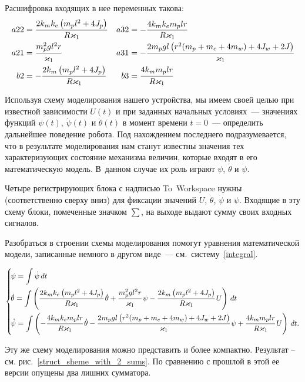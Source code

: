 \documentclass[12pt,a4paper,openany]{extarticle}
\begin{document}
Расшифровка входящих в нее переменных такова:
\begin{align}
	a22 &= \frac{2k_mk_e\left(m_pl^2 + 4J_p\right)}{R\varkappa_1} & 
	a32 &= -\frac{4k_mk_em_plr}{R\varkappa_1}\notag \\
	a21 &= \frac{m_p^2gl^2r}{\varkappa_1} & 
	a31 &= -\cfrac{2m_pgl\left(r^2(m_p + m_c + 4m_w) + 4J_w + 2J\right)}{\varkappa_1} \\
	b2 &= -\frac{2k_m\left(m_pl^2 + 4J_p\right)}{R\varkappa_1} & 
	b3 &= \cfrac{4k_mm_plr}{R\varkappa_1} \notag
\end{align}

Используя схему моделирования нашего устройства, мы имеем своей целью при известной зависимости $U(t)$ и при заданных начальных условиях~--- значениях функций $\psi(t)$, $\dot{\psi}(t)$ и $\dot{\theta}(t)$ в момент времени $t=0$~--- определить дальнейшее поведение робота.
Под нахождением последнего подразумевается, что в результате моделирования нам станут известны значения тех характеризующих состояние механизма величин, которые входят в его математическую модель.
В~данном случае их роль играют $\psi$, $\dot{\theta}$ и $\dot{\psi}$.

Четыре регистрирующих блока с надписью To~Workspace нужны (соответственно сверху вниз) для фиксации значений $U$, $\dot{\theta}$, $\dot{\psi}$ и $\psi$.
Входящие в эту схему блоки, помеченные значком $\sum$, на выходе выдают сумму своих входных сигналов.

Разобраться в строении схемы моделирования помогут уравнения математической модели, записанные немного в другом виде~--- см.~систему~\eqref{integral}.
 
\begin{equation}\label{integral}
	\left\{  
	\begin{aligned}
		\!&\psi = \int\dot{\psi}\,dt\\
		\!&\dot\theta = \int\left(\cfrac{2k_mk_e\left(m_pl^2 + 4J_p\right)}{R\varkappa_1}\,\dot\theta +
		\cfrac{m_p^2gl^2r}{\varkappa_1}\,\psi 
		-\cfrac{2k_m\left(m_pl^2 + 4J_p\right)}{R\varkappa_1}\,U\right)\,dt\\
		\!&\dot\psi = \int\left(-\cfrac{4k_mk_em_plr}{R\varkappa_1}\,\dot\theta -
		\cfrac{2m_pgl\left(r^2(m_p + m_c + 4m_w) + 4J_w + 2J\right)}{\varkappa_1}\,\psi +
		\cfrac{4k_mm_plr}{R\varkappa_1}\,U\right)\,dt.
	\end{aligned}   
	\right.
\end{equation}

Эту же схему моделирования можно представить и более компактно. Результат -- см. рис.~\ref{struct_sheme_with_2_sums}. По сравнению с прошлой в этой ее версии опущены два лишних сумматора.
\end{document}
